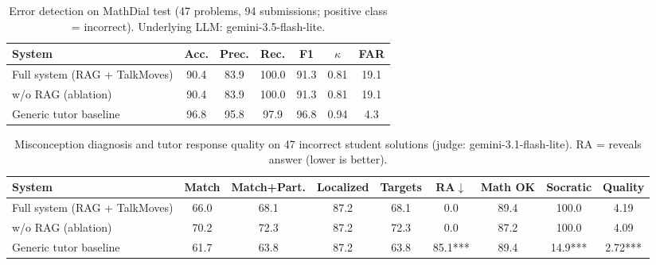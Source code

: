 \begin{table}[t]\centering\small
\caption{Error detection on MathDial test (47 problems, 94 submissions; positive class = incorrect). Underlying LLM: gemini-3.5-flash-lite.}
\begin{tabular}{lcccccc}\toprule
System & Acc. & Prec. & Rec. & F1 & $\kappa$ & FAR \\\midrule
Full system (RAG + TalkMoves) & 90.4 & 83.9 & 100.0 & 91.3 & 0.81 & 19.1 \\
w/o RAG (ablation) & 90.4 & 83.9 & 100.0 & 91.3 & 0.81 & 19.1 \\
Generic tutor baseline & 96.8 & 95.8 & 97.9 & 96.8 & 0.94 & 4.3 \\
\bottomrule\end{tabular}\end{table}

\begin{table}[t]\centering\small
\caption{Misconception diagnosis and tutor response quality on 47 incorrect student solutions (judge: gemini-3.1-flash-lite). RA = reveals answer (lower is better).}
\begin{tabular}{lcccccccc}\toprule
System & Match & Match+Part. & Localized & Targets & RA$\downarrow$ & Math OK & Socratic & Quality \\\midrule
Full system (RAG + TalkMoves) & 66.0 & 68.1 & 87.2 & 68.1 & 0.0 & 89.4 & 100.0 & 4.19 \\
w/o RAG (ablation) & 70.2 & 72.3 & 87.2 & 72.3 & 0.0 & 87.2 & 100.0 & 4.09 \\
Generic tutor baseline & 61.7 & 63.8 & 87.2 & 63.8 & 85.1*** & 89.4 & 14.9*** & 2.72*** \\
\bottomrule\end{tabular}\end{table}
